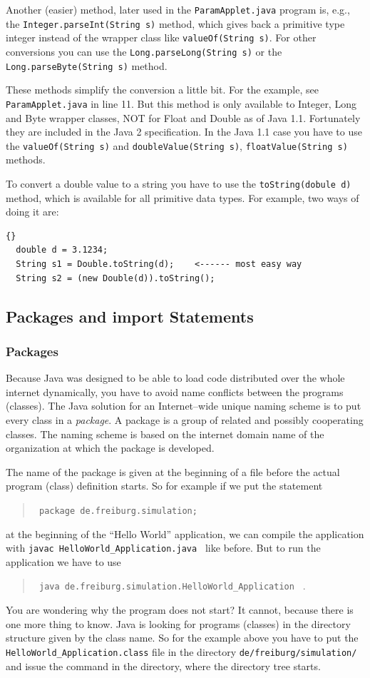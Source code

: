 Another (easier) method, 
later used in the \verb|ParamApplet.java| program is, e.g.,
the \verb|Integer.parseInt(String s)| method, which gives back a primitive
type integer instead of the wrapper class like \verb|valueOf(String s)|.
For other conversions you can use the \verb|Long.parseLong(String s)| or the
\verb|Long.parseByte(String s)| method.

These methods  simplify the conversion a little bit. For the example, see
\verb|ParamApplet.java| in line 11. But this method is only 
available to Integer, Long and Byte wrapper classes, NOT for
Float and Double as of Java 1.1. Fortunately they are included in the
Java 2 specification.
In the Java 1.1 case you have to use the \verb|valueOf(String s)| and
\verb|doubleValue(String s)|, \verb|floatValue(String s)| methods.

To convert a double value to a string you have to use the \verb|toString(dobule d)|
method, which is available for all primitive data types.
For example, two ways of doing it are:
\begin{lstlisting}{}
  double d = 3.1234;
  String s1 = Double.toString(d);    <------ most easy way
  String s2 = (new Double(d)).toString();
\end{lstlisting} 



\subsection{Packages and import Statements}
\subsubsection{Packages}
Because Java was designed to be able to load code distributed
over the whole internet dynamically, you have to avoid name conflicts
between the programs (classes). The Java solution 
for an Internet--wide unique naming scheme is to put
every class in a \emph{package}. A package  is a group of related
and possibly cooperating classes. The naming scheme is based on the
internet domain name of the organization at which the package is developed.

The name of the package is given
at the beginning of a file before the actual program (class)
definition starts. So for example if we put the statement
\begin{quotation}
  \verb/ package de.freiburg.simulation; / 
\end{quotation}
at the beginning of the ``Hello World'' application, we can compile
the application with \verb/javac HelloWorld_Application.java / like before.
But to run the application we have to use
\begin{quotation}
  \verb/ java de.freiburg.simulation.HelloWorld_Application / . 
\end{quotation}
You are wondering why the program does not start? It cannot, because
there is one more thing to know. Java is looking for programs (classes)
in the directory structure given by the class name. So
for the example above you have to put the \verb/HelloWorld_Application.class/ file
in the directory \verb|de/freiburg/simulation/| and issue the command
in the directory, where the directory tree starts.

